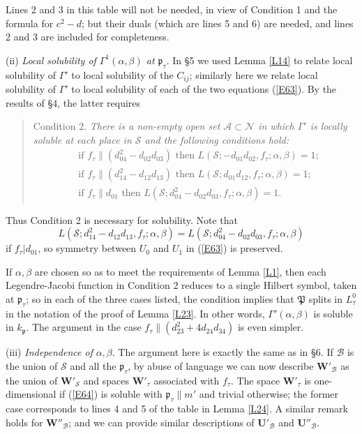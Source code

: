 \documentclass[12pt]{article}
\def\bU{{\mathbf U}}
\def\bW{{\mathbf W}}
\def\fp{{\mathfrak p}}
\def\fP{{\mathfrak P}}
\def\ga{{\alpha}}
\def\gb{{\beta}}
\def\gG{{\Gamma}}
\def\sA{{\mathcal A}}
\def\sB{{\mathcal B}}
\def\sN{{\mathcal N}}
\def\sS{{\mathcal S}}
\begin{document}
Lines 2 and 3 in this table will not be needed, in view of
Condition 1 and the formula for $c^2-d$; but their duals
(which are lines 5 and 6) are needed, and lines 2 and 3 are
included for completeness.

\medskip

\noindent (ii) \emph{Local solubility of $\gG^1(\ga,\gb)$ at
$\fp_\tau$}. In \S5 we used Lemma \ref{L14} to relate local
solubility of $\gG'$ to local solubility of the $C_{ij}$;
similarly here we relate local solubility of $\gG'$ to local
solubility of each of the two equations (\ref{E63}). By the
results of \S4, the latter requires
\begin{quote} Condition 2. \emph{There is a non-empty open set
$\sA\subset\sN$ in which $\gG'$ is locally soluble at each
place in $\sS$ and the following conditions hold:
\[ \begin{align*}
& \text{if $f_\tau\|(d_{04}^2-d_{02}d_{03})$ then } L(\sS;-d_{01}d_{02},f_\tau;\ga,\gb)=1; \\
& \text{if $f_\tau\|(d_{14}^2-d_{12}d_{13})$ then } L(\sS;d_{01}d_{12},f_\tau;\ga,\gb)=1; \\
& \text{if $f_\tau\|d_{01}$ then } L(\sS;d_{04}^2-d_{02}d_{03},f_\tau;\ga,\gb)=1.
\end{align*} \]} \end{quote}
Thus Condition 2 is necessary for solubility. Note that
\[ L(\sS;d_{14}^2-d_{12}d_{13},f_\tau;\ga,\gb)
=L(\sS;d_{04}^2-d_{02}d_{03},f_\tau;\ga,\gb) \]
if $f_{\tau}|d_{01}$, so symmetry between $U_0$ and $U_1$ in
(\ref{E63}) is preserved.

If $\ga,\gb$ are chosen so as to meet the requirements of
Lemma \ref{L1}, then each Legendre-Jacobi function in
Condition 2 reduces to a single Hilbert symbol, taken at
$\fp_\tau$; so in each of the three cases listed, the
condition implies that $\fP$ splits in $L^0_\tau$ in the
notation of the proof of Lemma \ref{L23}. In other words,
$\gG'(\ga,\gb)$ is soluble in $k_\fp$. The argument in the
case $f_\tau\|(d_{23}^2+4d_{24}d_{34})$ is even simpler.

\medskip


\noindent (iii) \emph{Independence of} $\ga,\gb$. The argument
here
is exactly the same as in \S6. If $\sB$ is the union of $\sS$
and all the $\fp_\tau$, by abuse of language we can now
describe $\bW'_\sB$ as the union of $\bW'_\sS$ and spaces
$\bW'_\tau$ associated with $f_\tau$. The space $\bW'_\tau$ is
one-dimensional if (\ref{E64}) is soluble with $\fp_\tau\|m'$
and trivial otherwise; the former case corresponds to lines
4 and 5 of the table in Lemma \ref{L24}. A similar remark
holds for $\bW''_\sB$; and we can provide similar descriptions of $\bU'_\sB$ and $\bU''_\sB$.
\end{document}
